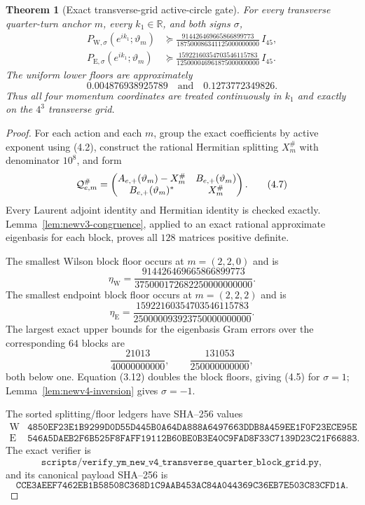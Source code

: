 \documentclass[11pt,oneside]{article}
\newtheorem{theorem}{Theorem}[section]
\theoremstyle{definition}
\theoremstyle{remark}
\begin{document}
\begin{theorem}[Exact transverse-grid active-circle gate]
\label{thm:newv4-grid}
For every transverse quarter-turn anchor \(m\), every
\(k_1\in\mathbb R\), and both signs \(\sigma\),
\[
\begin{aligned}
 P_{\mathrm W,\sigma}(e^{ik_1};\vartheta_m)
 &\succeq
 \frac{914426469665866899773}
 {187500086341125000000000}\,I_{45},\\
 P_{\mathrm E,\sigma}(e^{ik_1};\vartheta_m)
 &\succeq
 \frac{15922160354703546115783}
 {125000046961875000000000}\,I_{45}.
\end{aligned}
\tag{4.5}
\]
The uniform lower floors are approximately
\[
 0.004876938925789\quad\text{and}\quad0.1273772349826.    \tag{4.6}
\]
Thus all four momentum coordinates are treated continuously in
\(k_1\) and exactly on the \(4^3\) transverse grid.
\end{theorem}

\begin{proof}
For each action and each \(m\), group the exact coefficients by
active exponent using (4.2), construct the rational Hermitian
splitting \(X_m^\#\) with denominator \(10^8\), and form
\[
 {\cal Q}_{e,m}^{\#}
 =
 \begin{pmatrix}
 A_{e,+}(\vartheta_m)-X_m^\#&B_{e,+}(\vartheta_m)\\
 B_{e,+}(\vartheta_m)^*&X_m^\#
 \end{pmatrix}.                                           \tag{4.7}
\]
Every Laurent adjoint identity and Hermitian identity is checked
exactly.  Lemma~\ref{lem:newv3-congruence}, applied to an exact
rational approximate eigenbasis for each block, proves all \(128\)
matrices positive definite.

The smallest Wilson block floor occurs at \(m=(2,2,0)\) and is
\[
 \eta_{\mathrm W}=
 \frac{914426469665866899773}
 {375000172682250000000000}.                              \tag{4.8}
\]
The smallest endpoint block floor occurs at \(m=(2,2,2)\) and is
\[
 \eta_{\mathrm E}=
 \frac{15922160354703546115783}
 {250000093923750000000000}.                              \tag{4.9}
\]
The largest exact upper bounds for the eigenbasis Gram errors over
the corresponding \(64\) blocks are
\[
 \frac{21013}{40000000000},\qquad
 \frac{131053}{250000000000},                             \tag{4.10}
\]
both below one.  Equation (3.12) doubles the block floors, giving
(4.5) for \(\sigma=1\); Lemma~\ref{lem:newv4-inversion} gives
\(\sigma=-1\).

The sorted splitting/floor ledgers have SHA--256 values
\[
\begin{array}{c|c}
\mathrm W&
\texttt{4850EF23E1B9299D0D55D445B0A64DA888A6497663DDB8A459EE1F0F23ECE95E}\\
\mathrm E&
\texttt{546A5DAEB2F6B525F8FAFF19112B60BE0B3E40C9FAD8F33C7139D23C21F66883}.
\end{array}                                               \tag{4.11}
\]
The exact verifier is
\[
\texttt{scripts/verify\_ym\_new\_v4\_transverse\_quarter\_block\_grid.py},
\]
and its canonical payload SHA--256 is
\[
\texttt{CCE3AEEF7462EB1B58508C368D1C9AAB453AC84A044369C36EB7E503C83CFD1A}.
                                                               \tag{4.12}
\]
\end{proof}
\end{document}
